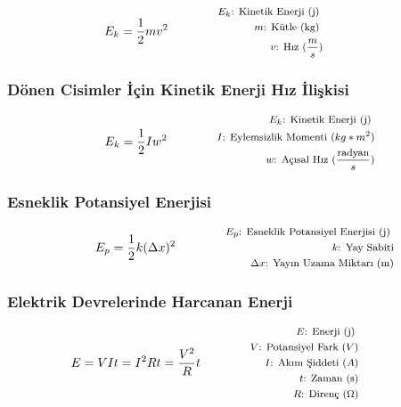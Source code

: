 \begin{equation}
    E_k = \frac{1}{2} m v^2 \qquad \qquad \parbox{4cm}{\footnotesize$\begin{aligned}
        E_k\text{: Kinetik  Enerji (j) } \\
        m\text{: Kütle (kg) } \\ 
        v\text{: Hız } (\frac{m}{s})
    \end{aligned}$}
\end{equation}

\subsubsection*{Dönen Cisimler İçin Kinetik Enerji Hız İlişkisi}

\begin{equation}
    E_k = \frac{1}{2} I w^2 \qquad \qquad \parbox{4cm}{\footnotesize$\begin{aligned}
        E_k\text{: Kinetik  Enerji (j) } \\
        I\text{: Eylemsizlik Momenti (} kg*m^2\text{)} \\
        w\text{: Açısal Hız } (\frac{\text{radyan}}{s})
    \end{aligned}$}
\end{equation}

\subsubsection*{Esneklik Potansiyel Enerjisi}
\begin{equation}
    E_p = \frac{1}{2}k(\Delta x)^2 \qquad \qquad \parbox{4cm}{\footnotesize$\begin{aligned}
        E_p\text{: Esneklik Potansiyel Enerjisi (j) } \\
        k\text{: Yay Sabiti} \\
        \Delta x\text{: Yayın Uzama Miktarı (m)}
\end{aligned}$}
\end{equation}

\subsubsection*{Elektrik Devrelerinde Harcanan Enerji}
\begin{equation}
    E = VIt = I^2Rt = \frac{V^2}{R}t \qquad \qquad \parbox{4cm}{\footnotesize$\begin{aligned}
        E\text{: Enerji (j) } \\
        V\text{: Potansiyel Fark } (V) \\
        I\text{: Akım Şiddeti } (A) \\
        t\text{: Zaman (s)} \\
        R\text{: Direnç } (\Omega)
\end{aligned}$}
\end{equation}

